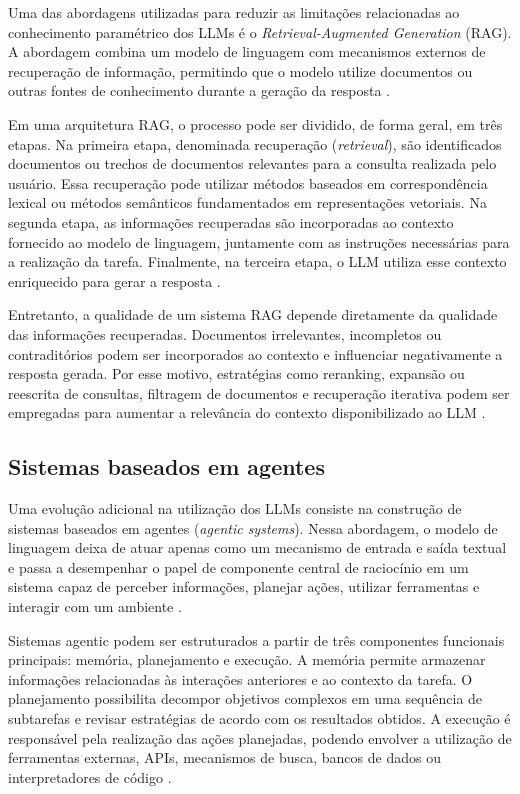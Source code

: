 Uma das abordagens utilizadas para reduzir as limitações relacionadas ao conhecimento paramétrico dos LLMs é o \textit{Retrieval-Augmented Generation} (RAG). A abordagem combina um modelo de linguagem com mecanismos externos de recuperação de informação, permitindo que o modelo utilize documentos ou outras fontes de conhecimento durante a geração da resposta \cite{lewis2020rag}.

Em uma arquitetura RAG, o processo pode ser dividido, de forma geral, em três etapas. Na primeira etapa, denominada recuperação (\textit{retrieval}), são identificados documentos ou trechos de documentos relevantes para a consulta realizada pelo usuário. Essa recuperação pode utilizar métodos baseados em correspondência lexical ou métodos semânticos fundamentados em representações vetoriais. Na segunda etapa, as informações recuperadas são incorporadas ao contexto fornecido ao modelo de linguagem, juntamente com as instruções necessárias para a realização da tarefa. Finalmente, na terceira etapa, o LLM utiliza esse contexto enriquecido para gerar a resposta \cite{zhao2026survey}.

Entretanto, a qualidade de um sistema RAG depende diretamente da qualidade das informações recuperadas. Documentos irrelevantes, incompletos ou contraditórios podem ser incorporados ao contexto e influenciar negativamente a resposta gerada. Por esse motivo, estratégias como reranking, expansão ou reescrita de consultas, filtragem de documentos e recuperação iterativa podem ser empregadas para aumentar a relevância do contexto disponibilizado ao LLM \cite{zhao2026survey}.

\subsection{Sistemas baseados em agentes}
\label{subsec:agentic}

Uma evolução adicional na utilização dos LLMs consiste na construção de sistemas baseados em agentes (\textit{agentic systems}). Nessa abordagem, o modelo de linguagem deixa de atuar apenas como um mecanismo de entrada e saída textual e passa a desempenhar o papel de componente central de raciocínio em um sistema capaz de perceber informações, planejar ações, utilizar ferramentas e interagir com um ambiente \cite{zhao2026survey}.

Sistemas agentic podem ser estruturados a partir de três componentes funcionais principais: memória, planejamento e execução. A memória permite armazenar informações relacionadas às interações anteriores e ao contexto da tarefa. O planejamento possibilita decompor objetivos complexos em uma sequência de subtarefas e revisar estratégias de acordo com os resultados obtidos. A execução é responsável pela realização das ações planejadas, podendo envolver a utilização de ferramentas externas, APIs, mecanismos de busca, bancos de dados ou interpretadores de código \cite{zhao2026survey}.

